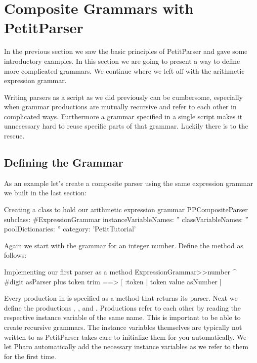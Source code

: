 \documentclass[a4paper,10pt,twoside]{book}
\begin{document}
\section{Composite Grammars with PetitParser}

In the previous section we saw the basic principles of PetitParser and
gave some introductory examples. In this section we are going to
present a way to define more complicated grammars. We continue where
we left off with the arithmetic expression grammar.

Writing parsers as a script as we did previously can be cumbersome,
especially when grammar productions are mutually recursive and refer
to each other in complicated ways. Furthermore a grammar specified in
a single script makes it unnecessary hard to reuse specific parts of
that grammar. Luckily there is  to the rescue.

\subsection{Defining the Grammar}

As an example let's create a composite parser using the same
expression grammar we built in the last section:

\begin{script}{Creating a class to hold our arithmetic expression grammar}
PPCompositeParser subclass: #ExpressionGrammar
   instanceVariableNames: ''
   classVariableNames: ''
   poolDictionaries: ''
   category: 'PetitTutorial'
\end{script}

Again we start with the grammar for an integer number. Define the
method  as follows:

\begin{script}{Implementing our first parser as a method}
ExpressionGrammar>>number
   ^ #digit asParser plus token trim ==> [ :token | token value asNumber ]
\end{script}

Every production in  is specified as a method
that returns its parser. Next we define the productions ,
, and . Productions refer to each other by reading
the respective instance variable of the same name. This is important
to be able to create recursive grammars. The instance variables
themselves are typically not written to as PetitParser takes care to
initialize them for you automatically. We let Pharo automatically add
the necessary instance variables as we refer to them for the first
time.
\end{document}
